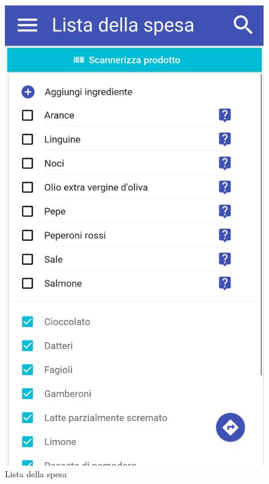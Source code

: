 \begin{figure}[H]
	\begin{minipage}{.49\textwidth}
		\includegraphics[width=\textwidth]{img/wireframe/lista_della_spesa.png}
		\caption{Lista della spesa}
	\end{minipage}
	\hfill
	\begin{minipage}{.49\textwidth}

\end{minipage}
\end{figure}
